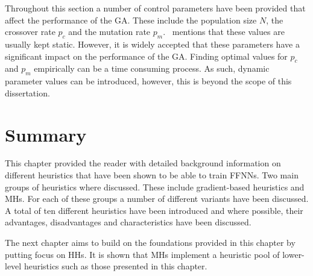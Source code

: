 Throughout this section a number of control parameters have been provided that affect the performance of the \acs{GA}. These include the population size $N$, the crossover rate $p_{c}$ and the mutation rate $p_{m}$.~\citeauthor{ref:engelbrecht:2007}\cite{ref:engelbrecht:2007} mentions that these values are usually kept static. However, it is widely accepted that these parameters have a significant impact on the performance of the \acs{GA}.  Finding optimal values for $p_{c}$ and  $p_{m}$ empirically can be a time consuming process. As such, dynamic parameter values can be introduced, however, this is beyond the scope of this dissertation.


\section{Summary}
\label{sec:heuristics:summary}

This chapter provided the reader with detailed background information on different heuristics that have been shown to be able to train \acp{FFNN}. Two main groups of heuristics where discussed. These include gradient-based heuristics and \aclp{MH}. For each of these groups a number of different variants have been discussed. A total of ten different heuristics have been introduced and where possible, their advantages, disadvantages and characteristics have been discussed.

The next chapter aims to build on the foundations provided in this chapter by putting focus on \acp{HH}. It is shown that \acp{MH} implement a heuristic pool of lower-level heuristics such as those presented in this chapter.










